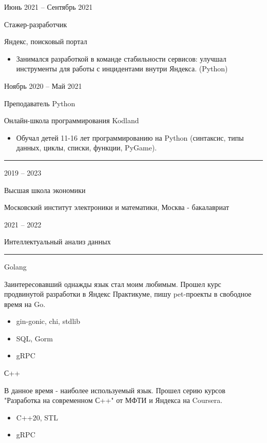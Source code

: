 \documentclass[a4paper,10pt]{article}
\newlength{\cvcolumngapwidth}
\newlength{\cvleftcolumnwidth}
\newlength{\cvrightcolumnwidth}
\newcommand{\cvsectionstyle}[1]{{\normalsize\cvsectionfont\textcolor{cvsectioncolor}{#1}}}
\newcommand{\cvtitlestyle}[1]{{\large\cvtitlefont\textcolor{cvtitlecolor}{#1}}}
\newcommand{\cvdurationstyle}[1]{{\small\cvdurationfont\textcolor{cvdurationcolor}{#1}}}
\newcommand{\cvheadingstyle}[1]{{\normalsize\cvheadingfont\textcolor{cvheadingcolor}{#1}}}
\newlength{\cvafteritemskipamount}
\newlength{\cvaftersectionskipamount}
\newlength{\cvbetweensectionandheadingextraskipamount}
\newlength{\cvaftertitleskipamount}
\newlength{\cvparskip}
\newcommand{\cvsection}[1]{
    \begin{minipage}[t]{\cvleftcolumnwidth}
        \raggedleft\cvsectionstyle{#1}
    \end{minipage}%
    \hspace{\cvcolumngapwidth}%
    \begin{minipage}[t]{\cvrightcolumnwidth}
        \textcolor{cvrulecolor}{\rule{\cvrightcolumnwidth}{0.3mm}}
    \end{minipage}

    \vspace{\cvaftersectionskipamount}
}
\newcommand{\cvitem}[2]{
    \begin{minipage}[t]{\cvleftcolumnwidth}
        \raggedleft #1
    \end{minipage}%
    \hspace{\cvcolumngapwidth}%
    \begin{minipage}[t]{\cvrightcolumnwidth}
        \setlength{\parskip}{\cvparskip} #2
    \end{minipage}

    \vspace{\cvafteritemskipamount}
}
\newcommand{\cvtitle}[1]{
    \cvtitlestyle{#1}

    \vspace{\cvaftertitleskipamount}
    \vspace{-\cvparskip}
}
\begin{document}
\cvitem{
    \cvdurationstyle{Июнь 2021 -- Сентябрь 2021}
}{
    \cvtitle{Стажер-разработчик}

    Яндекс, поисковый портал

    \begin{itemize}[leftmargin=*]
        \item Занимался разработкой в команде стабильности сервисов: улучшал инструменты для работы с инцидентами внутри Яндекса. (Python)
    \end{itemize}
}

\cvitem{
    \cvdurationstyle{Ноябрь 2020 -- Май 2021}
}{
    \cvtitle{Преподаватель Python}

    Онлайн-школа программирования Kodland

    \begin{itemize}[leftmargin=*]
        \item Обучал детей 11-16 лет программированию на Python (синтаксис, типы данных, циклы, списки, функции, PyGame).
    \end{itemize}
}



\cvsection{Образование}

\cvitem{
    \cvdurationstyle{2019 -- 2023}
}{
    \cvtitle{Высшая школа экономики}

    Московский институт электроники и математики, Москва - бакалавриат
}

\cvitem{
    \cvdurationstyle{2021 -- 2022}
}{
    Интеллектуальный анализ данных

}


\cvsection{Навыки}

\vspace{\cvbetweensectionandheadingextraskipamount}

\cvitem{
    \cvheadingstyle{Golang}
}{
    Заинтересовавший однажды язык стал моим любимым. Прошел курс продвинутой разработки в Яндекс Практикуме, пишу pet-проекты в свободное время на Go.
    \begin{itemize}
        \item gin-gonic, chi, stdlib
        \item SQL, Gorm
        \item gRPC
    \end{itemize}
}

\cvitem{
    \cvheadingstyle{С++}
}{
    В данное время - наиболее используемый язык. Прошел серию курсов "Разработка на современном С++" от МФТИ и Яндекса на Coursera.
    \begin{itemize}
        \item C++20, STL
        \item gRPC
    \end{itemize}
}
\end{document}

